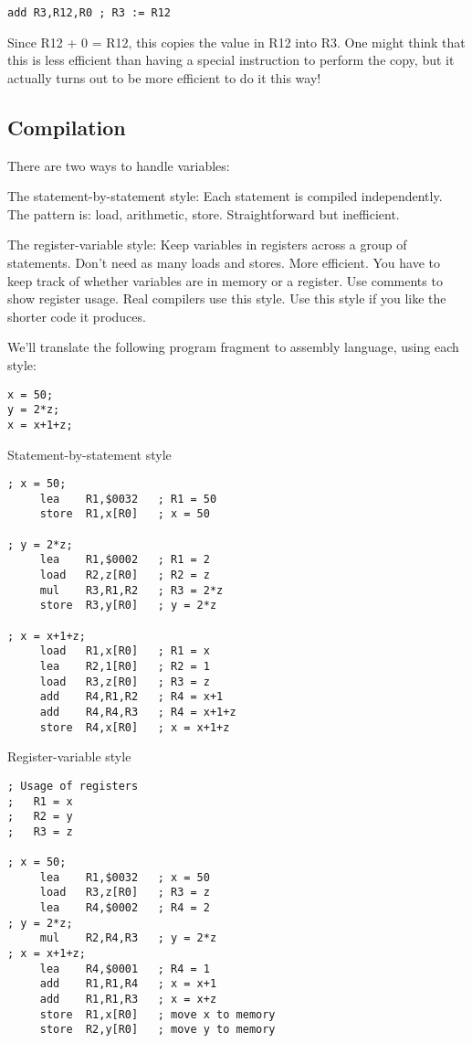 \documentclass[11pt]{article}
\begin{document}
\begin{verbatim}
add R3,R12,R0 ; R3 := R12
\end{verbatim}

Since R12 + 0 = R12, this copies the value in R12 into R3.  One might
think that this is less efficient than having a special instruction to
perform the copy, but it actually turns out to be more efficient to do
it this way!

\subsection*{Compilation}
\label{sec:org6794282}

There are two ways to handle variables:

The statement-by-statement style: Each statement is compiled
independently.  The pattern is: load, arithmetic, store.
Straightforward but inefficient.

The register-variable style: Keep variables in registers across a
group of statements.  Don't need as many loads and stores.  More
efficient.  You have to keep track of whether variables are in memory
or a register.  Use comments to show register usage.  Real compilers
use this style.  Use this style if you like the shorter code it
produces.

We'll translate the following program fragment to assembly
language, using each style:

\begin{verbatim}
x = 50;
y = 2*z;
x = x+1+z;
\end{verbatim}

Statement-by-statement style

\begin{verbatim}
; x = 50;
     lea    R1,$0032   ; R1 = 50
     store  R1,x[R0]   ; x = 50

; y = 2*z;
     lea    R1,$0002   ; R1 = 2
     load   R2,z[R0]   ; R2 = z
     mul    R3,R1,R2   ; R3 = 2*z
     store  R3,y[R0]   ; y = 2*z

; x = x+1+z;
     load   R1,x[R0]   ; R1 = x
     lea    R2,1[R0]   ; R2 = 1
     load   R3,z[R0]   ; R3 = z
     add    R4,R1,R2   ; R4 = x+1
     add    R4,R4,R3   ; R4 = x+1+z
     store  R4,x[R0]   ; x = x+1+z
\end{verbatim}

Register-variable style

\begin{verbatim}
; Usage of registers
;   R1 = x
;   R2 = y
;   R3 = z

; x = 50;
     lea    R1,$0032   ; x = 50
     load   R3,z[R0]   ; R3 = z
     lea    R4,$0002   ; R4 = 2
; y = 2*z;
     mul    R2,R4,R3   ; y = 2*z
; x = x+1+z;
     lea    R4,$0001   ; R4 = 1
     add    R1,R1,R4   ; x = x+1
     add    R1,R1,R3   ; x = x+z
     store  R1,x[R0]   ; move x to memory
     store  R2,y[R0]   ; move y to memory
\end{verbatim}
\end{document}
